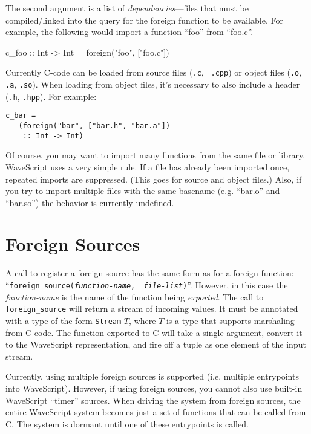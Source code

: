 The second argument is a list of {\em dependencies}---files that must
be compiled/linked into the query for the foreign function to be
available.
%
For example, the following would import a function ``foo'' from ``foo.c''.

\begin{wscode}
c\_foo :: Int -> Int = foreign("foo", ["foo.c"])
\end{wscode}


Currently C-code can be loaded from source files ({\tt .c}, {\tt
  .cpp}) or object files ({\tt .o}, {\tt .a}, {\tt .so}).  When
  loading from object files, it's necessary to also include a header
  ({\tt .h}, {\tt .hpp}).  For example:

\begin{verbatim}
c_bar = 
   (foreign("bar", ["bar.h", "bar.a"]) 
    :: Int -> Int)
\end{verbatim}

Of course, you may want to import many functions from the same file or
library.  WaveScript uses a very simple rule.  If a file has already
been imported once, repeated imports are suppressed.  (This goes for
source and object files.)  Also, if you try to import multiple files with
the same basename (e.g. ``bar.o'' and ``bar.so'') the behavior is
currently undefined.





\section{Foreign Sources}

A call to register a foreign source has the same form as for a foreign
function: ``{\tt foreign\_source({\em function-name}, {\em
file-list})}''.  However, in this case the {\em function-name} is the
name of the function being {\em exported}.  The call to {\tt
foreign\_source} will return a stream of incoming values.  It must be
annotated with a type of the form {\tt Stream} $T$, where $T$ is a
type that supports marshaling from C code.
%
The function exported to C will take a single argument, convert it to
the WaveScript representation, and fire off a tuple as one element of
the input stream.

Currently, using multiple foreign sources is supported (i.e. multiple
entrypoints into WaveScript).  However, if using foreign sources, you
cannot also use built-in WaveScript ``timer'' sources.  When driving
the system from foreign sources, the entire WaveScript system becomes
just a set of functions that can be called from C.  The system is
dormant until one of these entrypoints is called.

